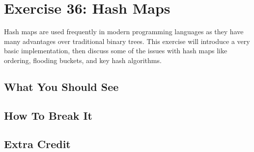 \chapter{Exercise 36: Hash Maps}

Hash maps are used frequently in modern programming languages as they have many advantages
over traditional binary trees.  This exercise will introduce a very basic implementation,
then discuss some of the issues with hash maps like ordering, flooding buckets, and 
key hash algorithms.

\section{What You Should See}


\section{How To Break It}


\section{Extra Credit}



